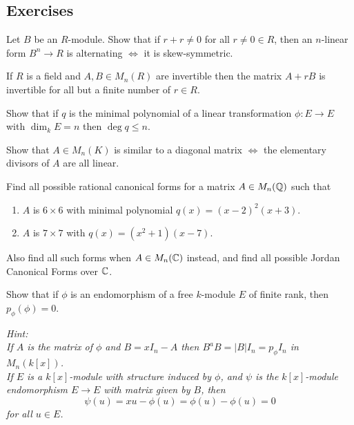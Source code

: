 \subsection{Exercises}

\begin{problem}[Hungerford 7.3.1]
\label{prob:1.1}
Let $B$ be an $R$-module. Show that if $r+r\neq 0$ for all $r\neq 0 \in R$, then an $n$-linear form $B^n\to R$ is alternating $\iff$ it is skew-symmetric.
\end{problem}

\begin{problem}[Hungerford 7.3.5]
\label{prob:1.1}
If $R$ is a field and $A, B \in M_n(R)$ are invertible then the matrix $A + rB$ is invertible for all but a finite number of $r\in R$.
\end{problem}

\begin{problem}[Hungerford 7.4.4]
\label{prob:1.1}
Show that if $q$ is the minimal polynomial of a linear transformation $\phi: E\to E$ with $\dim_k E = n$ then $\deg q \leq n$.
\end{problem}

\begin{problem}[Hungerford 7.4.8]
\label{prob:1.1}
Show that $A\in M_n(K)$ is similar to a diagonal matrix $\iff$ the elementary divisors of $A$ are all linear.
\end{problem}

\begin{problem}[Hungerford 7.4.10]
\label{prob:1.1}
Find all possible rational canonical forms for a matrix $A\in M_n(\Bbb Q)$ such that 

\begin{enumerate}
    \item $A$ is $6\times 6$ with minimal polynomial $q(x) = (x-2)^2(x+3)$.
    \item $A$ is $7\times 7$ with $q(x) = (x^2+1)(x-7)$.
\end{enumerate}

Also find all such forms when $A \in M_n(\Bbb C)$ instead, and find all possible Jordan Canonical Forms over $\Bbb C$.
\end{problem}

\begin{problem}[Hungerford 7.5.2]
\label{prob:1.1}
Show that if $\phi$ is an endomorphism of a free $k$-module $E$ of finite rank, then $p_\phi(\phi) = 0$.

\textit{
Hint: \\
If $A$ is the matrix of $\phi$ and $B = x I_n - A$ then $B^a B = |B| I_n = p_\phi I_n$ in $M_n(k[x])$. \\
If $E$ is a $k[x]$-module with structure induced by $\phi$, and $\psi$ is the $k[x]$-module endomorphism $E\to E$ with matrix given by $B$, then $$\psi(u) = x u -\phi(u) = \phi(u) - \phi(u) = 0$$ for all $u\in E$.
}
\end{problem}

